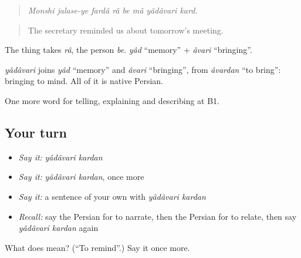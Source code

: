 \begin{quote}
\emph{Monshi jalase-ye fardâ râ be mâ yâdâvari kard.}
\end{quote}

\begin{quote}
The secretary reminded us about tomorrow's meeting.
\end{quote}

The thing takes \emph{râ}, the person \emph{be}. \emph{yâd} \textquotedblleft{}memory\textquotedblright{} + \emph{âvari} \textquotedblleft{}bringing\textquotedblright{}.

\begin{cousinweb}
\emph{yâdâvari} joins \emph{yâd} \textquotedblleft{}memory\textquotedblright{} and \emph{âvari} \textquotedblleft{}bringing\textquotedblright{}, from \emph{âvardan} \textquotedblleft{}to bring\textquotedblright{}: bringing to mind. All of it is native Persian.
\end{cousinweb}

\begin{grammarlens}[title={What you've built}]
One more word for telling, explaining and describing at B1.
\end{grammarlens}

\subsection*{Your turn}
\begin{itemize}
\raggedright
  \item \emph{Say it:} \emph{yâdâvari kardan}
  \item \emph{Say it:} \emph{yâdâvari kardan}, once more
  \item \emph{Say it:} a sentence of your own with \emph{yâdâvari kardan}
  \item \emph{Recall:} say the Persian for to narrate, then the Persian for to relate, then say \emph{yâdâvari kardan} again
\end{itemize}

\begin{tcolorbox}[breakable,colback=teal!4,colframe=teal!35!black,title={Before you move on}]
What does   mean? (\textquotedblleft{}To remind\textquotedblright{}.) Say it once more.
\end{tcolorbox}
